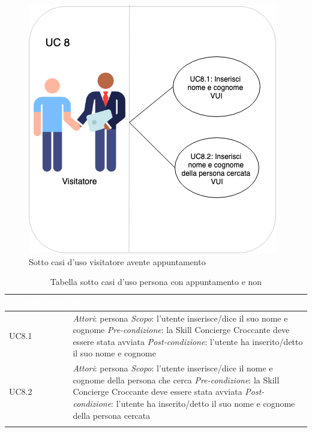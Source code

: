\begin{figure}[H] 
    \centering 
    \includegraphics[width=0.7\columnwidth]{immagini/casi_duso21.png}
    \caption{\label{fig:sotto_casi_duso_visitatore2}Sotto casi d'uso visitatore avente appuntamento}
\end{figure}
\begin{center}
	\centering
	\renewcommand{\arraystretch}{1.5}
	\begin{longtable}{  p{2.5cm} p{9.8cm} }
		\rowcolor{tableHead}
		\textbf{\textcolor{white}{Identificativo}} & \textbf{\textcolor{white}{Descrizione}} \\
		\endhead  
		
		UC8.1 &  \textit{Attori}: persona \newline \textit{Scopo}: l'utente inserisce/dice il suo nome e cognome \newline \textit{Pre-condizione}: la Skill Concierge Croccante deve essere stata avviata \newline \textit{Post-condizione}: l'utente ha inserito/detto il suo nome e cognome \\
		
		UC8.2 &  \textit{Attori}: persona  \newline \textit{Scopo}: l'utente inserisce/dice il nome e cognome della persona che cerca \newline \textit{Pre-condizione}: la Skill Concierge Croccante deve essere stata avviata \newline \textit{Post-condizione}: l'utente ha inserito/detto il suo nome e cognome della persona cercata \\

		\rowcolor{white}
		\caption{Tabella sotto casi d'uso persona con appuntamento e non}
	\end{longtable}
\end{center}
